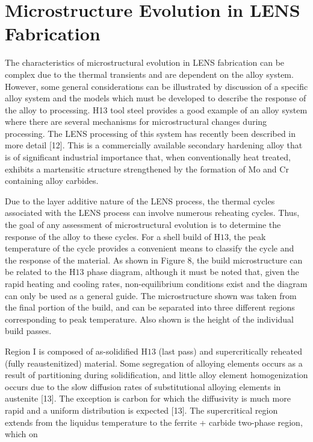 \documentclass[10pt]{article}
\begin{document}
\section*{Microstructure Evolution in LENS Fabrication}
The characteristics of microstructural evolution in LENS fabrication can be complex due to the thermal transients and are dependent on the alloy system. However, some general considerations can be illustrated by discussion of a specific alloy system and the models which must be developed to describe the response of the alloy to processing. H13 tool steel provides a good example of an alloy system where there are several mechanisms for microstructural changes during processing. The LENS processing of this system has recently been described in more detail [12]. This is a commercially available secondary hardening alloy that is of significant industrial importance that, when conventionally heat treated, exhibits a martensitic structure strengthened by the formation of Mo and $\mathrm{Cr}$ containing alloy carbides.

Due to the layer additive nature of the LENS process, the thermal cycles associated with the LENS process can involve numerous reheating cycles. Thus, the goal of any assessment of microstructural evolution is to determine the response of the alloy to these cycles. For a shell build of $\mathrm{H} 13$, the peak temperature of the cycle provides a convenient means to classify the cycle and the response of the material. As shown in Figure 8, the build microstructure can be related to the $\mathrm{H} 13$ phase diagram, although it must be noted that, given the rapid heating and cooling rates, non-equilibrium conditions exist and the diagram can only be used as a general guide. The microstructure shown was taken from the final portion of the build, and can be separated into three different regions corresponding to peak temperature. Also shown is the height of the individual build passes.

Region I is composed of as-solidified $\mathrm{H} 13$ (last pass) and supercritically reheated (fully reaustenitized) material. Some segregation of alloying elements occurs as a result of partitioning during solidification, and little alloy element homogenization occurs due to the slow diffusion rates of substitutional alloying elements in austenite [13]. The exception is carbon for which the diffusivity is much more rapid and a uniform distribution is expected [13]. The supercritical region extends from the liquidus temperature to the ferrite + carbide two-phase region, which on
\end{document}

